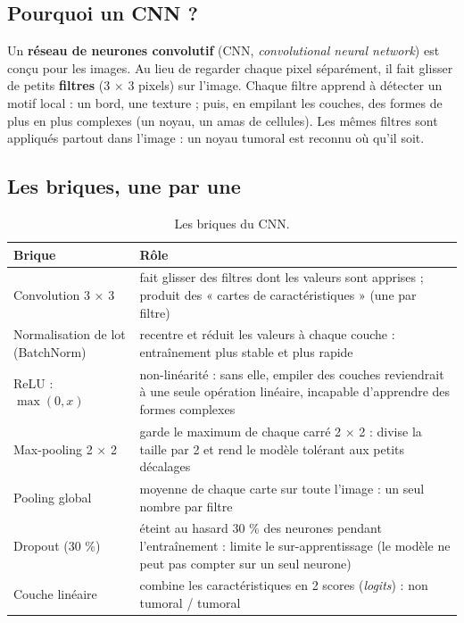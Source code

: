\documentclass[11pt,a4paper]{article}
\begin{document}
\subsection{Pourquoi un CNN ?}
Un \textbf{réseau de neurones convolutif} (CNN, \emph{convolutional neural network}) est conçu pour les
images. Au lieu de regarder chaque pixel séparément, il fait glisser de petits \textbf{filtres} (3 × 3 pixels)
sur l'image. Chaque filtre apprend à détecter un motif local : un bord, une texture ; puis, en empilant les
couches, des formes de plus en plus complexes (un noyau, un amas de cellules). Les mêmes filtres sont appliqués
partout dans l'image : un noyau tumoral est reconnu où qu'il soit.

\subsection{Les briques, une par une}
\begin{table}[H]
\centering
\begin{tabularx}{\textwidth}{lX}
\toprule
\textbf{Brique} & \textbf{Rôle} \\
\midrule
Convolution 3 × 3 & fait glisser des filtres dont les valeurs sont apprises ; produit des « cartes de
caractéristiques » (une par filtre) \\
Normalisation de lot (BatchNorm) & recentre et réduit les valeurs à chaque couche : entraînement plus stable
et plus rapide \\
ReLU : $\max(0, x)$ & non-linéarité : sans elle, empiler des couches reviendrait à une seule opération
linéaire, incapable d'apprendre des formes complexes \\
Max-pooling 2 × 2 & garde le maximum de chaque carré 2 × 2 : divise la taille par 2 et rend le modèle tolérant
aux petits décalages \\
Pooling global & moyenne de chaque carte sur toute l'image : un seul nombre par filtre \\
Dropout (30 \%) & éteint au hasard 30 \% des neurones pendant l'entraînement : limite le sur-apprentissage
(le modèle ne peut pas compter sur un seul neurone) \\
Couche linéaire & combine les caractéristiques en 2 scores (\emph{logits}) : non tumoral / tumoral \\
\bottomrule
\end{tabularx}
\caption{Les briques du CNN.}
\end{table}
\end{document}
